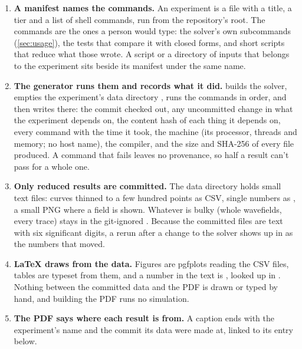 \begin{enumerate}
  \item \textbf{A manifest names the commands.} An experiment is a file
     with a title, a tier and a list of shell
    commands, run from the repository's root. The commands are the ones a person would type:
    the solver's own subcommands (\cref{sec:usage}), the tests that compare it with closed
    forms, and short scripts that reduce what those wrote. A script or a directory of inputs
    that belongs to the experiment sits beside its manifest under the same name.
  \item \textbf{The generator runs them and records what it did.}
     builds the solver, empties the experiment's
    data directory , runs the commands in order, and then
    writes  there: the commit checked out, any uncommitted change in
    what the experiment depends on, the content hash of each thing it depends on, every
    command with the time it took, the machine (its processor, threads and memory; no host
    name), the compiler, and the size and SHA-256 of every file produced. A command that
    fails leaves no provenance, so half a result can't pass for a whole one.
  \item \textbf{Only reduced results are committed.} The data directory holds small text
    files: curves thinned to a few hundred points as CSV, single numbers as
    , a small PNG where a field is shown. Whatever is bulky (whole
    wavefields, every trace) stays in the git-ignored . Because the
    committed files are text with six significant digits, a rerun after a change to the
    solver shows up in  as the numbers that moved.
  \item \textbf{LaTeX draws from the data.} Figures are pgfplots reading the CSV files, tables
    are typeset from them, and a number in the text is ,
    looked up in . Nothing between the committed data and the PDF is drawn
    or typed by hand, and building the PDF runs no simulation.
  \item \textbf{The PDF says where each result is from.} A caption ends with the
    experiment's name and the commit its data were made at, linked to its entry below.
\end{enumerate}

